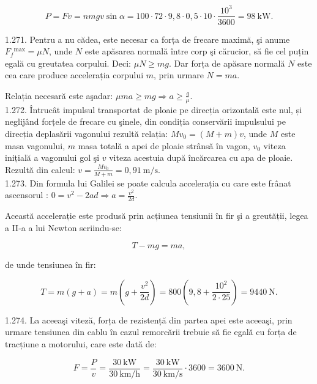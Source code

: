 \documentclass[10pt]{article}
\begin{document}
$$
P=F v=n m g v \sin \alpha=100 \cdot 72 \cdot 9,8 \cdot 0,5 \cdot 10 \cdot \frac{10^{3}}{3600}=98 \mathrm{~kW} .
$$

1.271. Pentru a nu cădea, este necesar ca forța de frecare maximă, şi anume $F_{f}{ }^{\max }=\mu N$, unde $N$ este apăsarea normală între corp şi cărucior, să fie cel puțin egală cu greutatea corpului. Deci: $\mu N \geq m g$. Dar forța de apăsare normală $N$ este cea care produce accelerația corpului $m$, prin urmare $N=m a$.

Relația necesară este aşadar: $\mu m a \geq m g \Rightarrow a \geq \frac{g}{\mu}$.\\
1.272. Întrucât impulsul transportat de ploaie pe direcția orizontală este nul, și neglijând forțele de frecare cu şinele, din condiția conservării impulsului pe direcția deplasării vagonului rezultă relația: $M v_{0}=(M+m) v$, unde $M$ este masa vagonului, $m$ masa totală a apei de ploaie strânsă în vagon, $v_{0}$ viteza inițială a vagonului gol şi $v$ viteza acestuia după încărcarea cu apa de ploaie. Rezultă din calcul: $v=\frac{M v_{0}}{M+m}=0,91 \mathrm{~m} / \mathrm{s}$.\\
1.273. Din formula lui Galilei se poate calcula accelerația cu care este frânat ascensorul : $0=v^{2}-2 a d \Rightarrow a=\frac{v^{2}}{2 d}$.

Această accelerație este produsă prin acțiunea tensiunii în fir şi a greutății, legea a II-a a lui Newton scriindu-se:

$$
T-m g=m a,
$$

de unde tensiunea în fir:

$$
T=m(g+a)=m\left(g+\frac{v^{2}}{2 d}\right)=800\left(9,8+\frac{10^{2}}{2 \cdot 25}\right)=9440 \mathrm{~N} .
$$

1.274. La aceeaşi viteză, forța de rezistență din partea apei este aceeaşi, prin urmare tensiunea din cablu în cazul remorcării trebuie să fie egală cu forța de tracțiune a motorului, care este dată de:

$$
F=\frac{P}{v}=\frac{30 \mathrm{~kW}}{30 \mathrm{~km} / \mathrm{h}}=\frac{30 \mathrm{~kW}}{30 \mathrm{~km} / \mathrm{s}} \cdot 3600=3600 \mathrm{~N} .
$$
\end{document}

